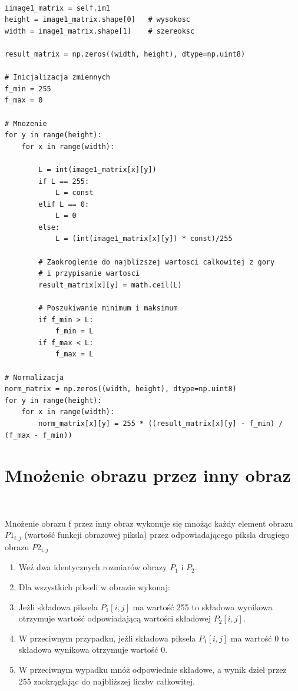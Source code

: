 \documentclass[final,a4paper,openany,12pt]{mwbk}
\begin{document}
\begin{lstlisting}[caption=Mnożenie obrazu szarego przez zadaną liczbę]

iimage1_matrix = self.im1
height = image1_matrix.shape[0]   # wysokosc
width = image1_matrix.shape[1]    # szereoksc

result_matrix = np.zeros((width, height), dtype=np.uint8)

# Inicjalizacja zmiennych
f_min = 255
f_max = 0

# Mnozenie 
for y in range(height):
    for x in range(width):  

        L = int(image1_matrix[x][y]) 
        if L == 255:
            L = const
        elif L == 0:
            L = 0
        else:
            L = (int(image1_matrix[x][y]) * const)/255 

        # Zaokroglenie do najblizszej wartosci calkowitej z gory
        # i przypisanie wartosci
        result_matrix[x][y] = math.ceil(L)

        # Poszukiwanie minimum i maksimum
        if f_min > L:
            f_min = L
        if f_max < L:
            f_max = L

# Normalizacja
norm_matrix = np.zeros((width, height), dtype=np.uint8)
for y in range(height):
    for x in range(width):
        norm_matrix[x][y] = 255 * ((result_matrix[x][y] - f_min) / (f_max - f_min))

\end{lstlisting}


\section {Mnożenie obrazu przez inny obraz}
\hfill\\
\indent

Mnożenie obrazu f przez inny obraz wykonuje się mnożąc każdy element obrazu $P1_{i,j}$ (wartość funkcji obrazowej piksla) przez odpowiadającego piksla drugiego obrazu $P2_{i,j}$

	\begin{enumerate}
		\item Weź dwa identycznych rozmiarów obrazy $P_{1}$ i $P_{2}$.
		\item Dla wszystkich pikseli w obrazie wykonaj:
		\item Jeżli składowa piksela $P_{1}[i,j]$ ma wartość 255 to składowa wynikowa otrzymuje wartość odpowiadającą wartości składowej $P_{2}[i,j]$.
		\item W przeciwnym przypadku, jeżli składowa piksela $P_{1}[i,j]$ ma wartość 0 to składowa wynikowa otrzymuje wartość 0.
		\item W przeciwnym wypadku mnóż odpowiednie składowe, a wynik dziel przez 255 zaokrąglając do najbliższej liczby całkowitej.
	\end{enumerate}
\end{document}
